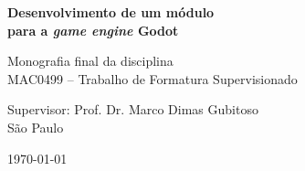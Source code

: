 \newpage
\thispagestyle{empty}
  \begin{center}
    \vspace*{2.3 cm}
    \textbf{\Large{Desenvolvimento de um módulo\\
    para a \textit{game engine} Godot}}
    \vspace*{2 cm}
  \end{center}

  \vskip 2cm

  \begin{flushright}
    Monografia final da disciplina\\
    MAC0499 -- Trabalho de Formatura Supervisionado
  \end{flushright}

  \vskip 5cm

  \begin{center}
  Supervisor: Prof. Dr. Marco Dimas Gubitoso\\

  \vskip 5cm
  \normalsize{São Paulo}

  \today
  \end{center}
\pagebreak

